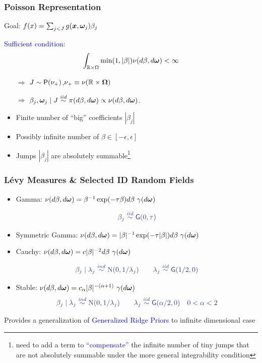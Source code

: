 \documentclass[dvips]{beamer}
\newcommand{\bs}[2]{\begin{frame} \frametitle{#1} 
{#2}
\end{frame} }
\newcommand{\blue}{\textcolor{Blue}}
\begin{document}
\bs{Poisson Representation}{ 
Goal: $f(x) = \sum_{j < J}  g(\bm x, \bm \omega_j) \beta_j$ 

\blue{Sufficient condition}:
$$\int_{\mathbb{R} \times \Omega} \min(1, |\beta|) \nu(d\beta, d
  \bm \omega) < \infty$$

\begin{itemize}
\item[$\Rightarrow$] $J \sim \mbox{\sf P}(\nu_+)$,\qquad $\nu_+\equiv
  \nu(\mathbb{R}\times\bm \Omega)$
\item[$\Rightarrow$] $\beta_j,\bm \omega_j \mid J \mathrel{\mathop{\sim}\limits^{\mathit{iid}}} \pi(d\beta, d\bm \omega)
  \propto \nu(d\beta,d\bm \omega)$.
\end{itemize}

\begin{itemize}
  \item Finite number of ``big'' coefficients $|\beta_j|$  
  \item Possibly infinite number of $\beta \in [-\epsilon, \epsilon]$
  \item Jumps $|\beta_j|$ are absolutely summable\footnote{need to add a term to
\blue{``compensate''} the infinite number of tiny jumps that are not
absolutely summable under the more general integrability condition}

  \end{itemize}
}


\bs{L\'evy Measures \& Selected ID Random Fields} {
  \begin{itemize}
  \item Gamma: $\nu( d\beta, d\bm \omega ) = \beta^{-1} \exp(-\tau
    \beta) d\beta \ \gamma(d\bm \omega) $

$$\blue{\beta_j \iid \Ga(0, \tau) } $$
   
\item Symmetric Gamma: $\nu( d\beta, d\bfomega ) = |\beta|^{-1} \exp(-\tau |\beta|) d\beta \ \gamma(d\bfomega)$

\item Cauchy:   $\nu( d\beta, d\bm \omega ) = c |\beta|^{-2} d\beta \
  \gamma(d\bm \omega)$

$$ \blue{\beta_j \mid \lambda_j \ind \N(0, 1/\lambda_j) \qquad
    \lambda_j \iid \Ga(1/2, 0)}$$


  \item Stable: $\nu(d\beta, d\bm \omega) =  c_\alpha |\beta|^{-(\alpha
       +1)}\ \gamma(d\bm \omega)$
$$\blue{\beta_j \mid \lambda_j \ind \N(0, 1/\lambda_j) \qquad
    \lambda_j \iid \Ga(\alpha/2, 0) \quad 0 < \alpha < 2}$$
  \end{itemize}
Provides a generalization of \blue{Generalized Ridge Priors}
to infinite dimensional case
}
\end{document}
